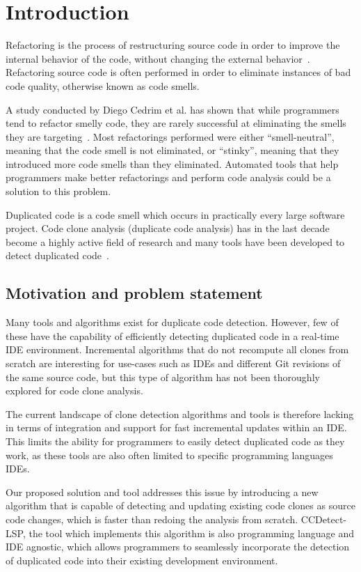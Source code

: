 \chapter{Introduction}

Refactoring is the process of restructuring source code in order to improve the internal
behavior of the code, without changing the external behavior~\cite[9]{fowlerrefactoring}.
Refactoring source code is often performed in order to eliminate instances of bad code
quality, otherwise known as code smells.

A study conducted by Diego Cedrim et al. has shown that while programmers tend to refactor
smelly code, they are rarely successful at eliminating the smells they are
targeting~\cite{Rohit_Gheyi_Impact}. Most refactorings performed were either
``smell-neutral'', meaning that the code smell is not eliminated, or ``stinky'',
meaning that they introduced more code smells than they eliminated. Automated tools that
help programmers make better refactorings and perform code analysis could be a solution to
this problem.

Duplicated code is a code smell which occurs in practically every large software project.
Code clone analysis (duplicate code analysis) has in the last decade become a highly active field
of research and many tools have been developed to detect duplicated
code~\cite[6]{Inoue_introduction_to_cc}. 

\section{Motivation and problem statement}

Many tools and algorithms exist for duplicate code detection. However, few of these have
the capability of efficiently detecting duplicated code in a real-time IDE environment.
Incremental algorithms that do not recompute all clones from scratch are interesting for
use-cases such as IDEs and different Git revisions of the same source code, but this type of
algorithm has not been thoroughly explored for code clone analysis.

The current landscape of clone detection algorithms and tools is therefore lacking in
terms of integration and support for fast incremental updates within an IDE. This limits
the ability for programmers to easily detect duplicated code as they work, as these tools
are also often limited to specific programming languages  IDEs.

Our proposed solution and tool addresses this issue by introducing a new algorithm that is
capable of detecting and updating existing code clones as source code changes, which is
faster than redoing the analysis from scratch. CCDetect-LSP, the tool which implements
this algorithm is also programming language and IDE agnostic, which allows programmers to
seamlessly incorporate the detection of duplicated code into their existing development
environment.

